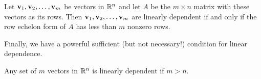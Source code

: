 \documentclass[../m73main.tex]{subfiles}
\begin{document}
\begin{theorem}
	Let $\mathbf{v}_1, \mathbf{v}_2, \ldots, \mathbf{v}_m$ be vectors in $\mathbb{R}^n$ and let $A$ be the $m \times n$ matrix with these vectors as its rows.
	Then $\mathbf{v}_1, \mathbf{v}_2, \ldots, \mathbf{v}_m$ are linearly dependent if and only if the row echelon form of $A$ has less than $m$ nonzero rows.
\end{theorem}

Finally, we have a powerful sufficient (but not necessary!) condition for linear dependence.

\begin{theorem}
	Any set of $m$ vectors in $\mathbb{R}^n$ is linearly dependent if $m > n$.
\end{theorem}
\end{document}
